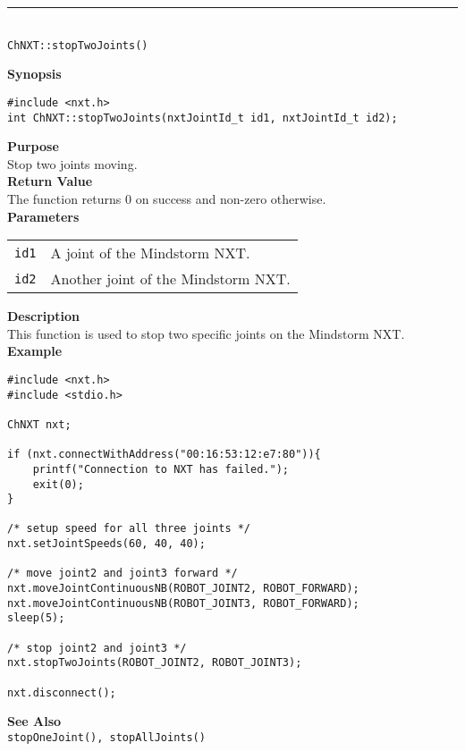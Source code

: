 \noindent
\vspace{5pt}
\rule{4.5in}{0.015in}\\
\noindent
{\LARGE \texttt{ChNXT::stopTwoJoints()} }\\


\noindent
{\bf Synopsis}
\vspace{-8pt}
\begin{verbatim}
#include <nxt.h>
int ChNXT::stopTwoJoints(nxtJointId_t id1, nxtJointId_t id2);
\end{verbatim}

\noindent
{\bf Purpose}\\
Stop two joints moving.\\

\noindent
{\bf Return Value}\\
The function returns 0 on success and non-zero otherwise.\\

\noindent
{\bf Parameters}\\
\vspace{-0.1in}
\begin{description}
\item
\begin{tabular}{ p{20mm}p{135mm} }
\texttt{id1}       &A joint of the Mindstorm NXT.\\
\texttt{id2}      &Another joint of the Mindstorm NXT.\\
\end{tabular}
\end{description}

\noindent
{\bf Description}\\
This function is used to stop two specific joints on the Mindstorm NXT.\\

\noindent
{\bf Example}
\begin{verbatim}
#include <nxt.h> 
#include <stdio.h>

ChNXT nxt;

if (nxt.connectWithAddress("00:16:53:12:e7:80")){
    printf("Connection to NXT has failed.");
    exit(0);
}
    
/* setup speed for all three joints */
nxt.setJointSpeeds(60, 40, 40);

/* move joint2 and joint3 forward */
nxt.moveJointContinuousNB(ROBOT_JOINT2, ROBOT_FORWARD);
nxt.moveJointContinuousNB(ROBOT_JOINT3, ROBOT_FORWARD);
sleep(5);

/* stop joint2 and joint3 */
nxt.stopTwoJoints(ROBOT_JOINT2, ROBOT_JOINT3);

nxt.disconnect();
\end{verbatim}

\noindent
{\bf See Also}\\
\texttt{stopOneJoint(), stopAllJoints()}\\
